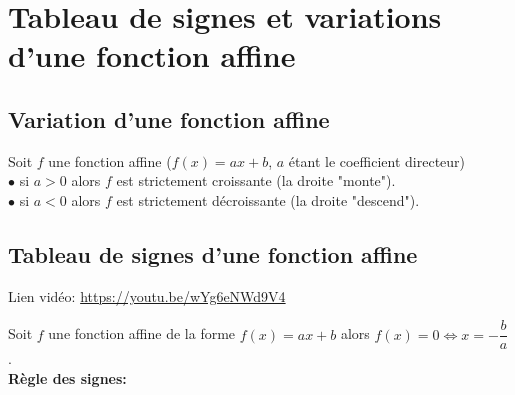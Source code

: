 \documentclass[12pt,a4paper]{article}
\begin{document}
\begin{framed}
\vspace{2cm}
\end{framed}

\section{Tableau de signes et variations d'une fonction affine}

\subsection{Variation d'une fonction affine}
\begin{pro} Soit $f$ une fonction affine ($f(x)=ax+b$, $a$ étant le coefficient directeur)\medskip\\
$\bullet$ si $a>0$ alors $f$ est strictement croissante (la droite "monte").\medskip\\
$\bullet$ si $a<0$ alors $f$ est strictement décroissante (la droite "descend").\medskip
\end{pro}


\subsection{Tableau de signes d'une fonction affine}




\begin{minipage}{0.85\textwidth}
Lien vidéo:
\url{https://youtu.be/wYg6eNWd9V4}
\end{minipage}
\begin{minipage}{0.2\textwidth}
\end{minipage}









\begin{defi}
Soit $f$ une fonction affine de la forme $f(x)=ax+b$ alors $f(x)=0 \iff x=-\dfrac{b}{a}$.\\
\textbf{Règle des signes:}
\begin{center}
\vspace{1cm}


\end{center}
\end{defi}
\end{document}
